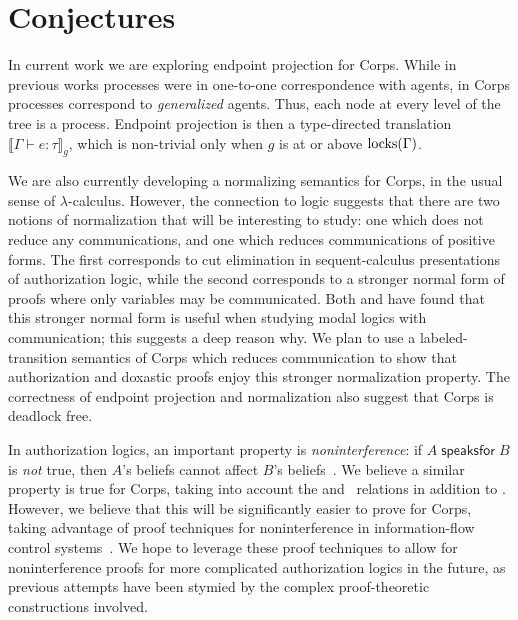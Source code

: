\section{Conjectures}
\label{sec:conjectures}

In current work we are exploring endpoint projection for Corps.
While in previous works processes were in one-to-one correspondence with agents, in Corps processes correspond to \emph{generalized} agents.
Thus, each node at every level of the tree is a process.
Endpoint projection is then a type-directed translation $\llbracket \Gamma \vdash e : \tau \rrbracket_{g}$, which is non-trivial only when $g$ is at or above $\text{locks}(\Gamma)$.

We are also currently developing a normalizing semantics for Corps, in the usual sense of $\lambda$-calculus.
However, the connection to logic suggests that there are two notions of normalization that will be interesting to study: one which does not reduce any communications, and one which reduces communications of positive forms.
The first corresponds to cut elimination in sequent-calculus presentations of authorization logic, while the second corresponds to a stronger normal form of proofs where only variables may be communicated.
Both \citet{HirschACAT20} and \citet{GratzerNKB20} have found that this stronger normal form is useful when studying modal logics with communication; this suggests a deep reason why.
We plan to use a labeled-transition semantics of Corps which reduces communication to show that authorization and doxastic proofs enjoy this stronger normalization property.
The correctness of endpoint projection and normalization also suggest that Corps is deadlock free.

In authorization logics, an important property is \emph{noninterference}: if $A \mathrel{\textsf{speaksfor}} B$ is \emph{not} true, then $A$'s beliefs cannot affect $B$'s beliefs~\cite{HirschACAT20,HirschC13,GargP06,JiaVMZZSZ08}.
We believe a similar property is true for Corps, taking into account the \canupname{} and \candownname{}~relations in addition to \cansendname{}.
However, we believe that this will be significantly easier to prove for Corps, taking advantage of proof techniques for noninterference in information-flow control systems~\cite{MenzHLG23,SilverHCHZ23,HirschC21}.
We hope to leverage these proof techniques to allow for noninterference proofs for more complicated authorization logics in the future, as previous attempts have been stymied by the complex proof-theoretic constructions involved.



